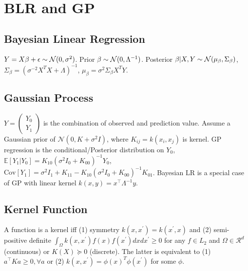 \section{BLR and GP}

\subsection*{Bayesian Linear Regression}
    $
    Y=X\beta+\epsilon \sim \mathcal{N}(0, \sigma^2)$. Prior $\beta \sim \mathcal{N}(0, \Lambda^{-1})$. Posterior $\beta | X, Y \sim\mathcal{N}(\mu_\beta, \Sigma_\beta)$, $\Sigma_\beta =  (\sigma^{-2}X^T X+\Lambda)^{-1}$, $\mu_\beta = \sigma^2\Sigma_{\beta}X^T Y$. 



\subsection*{Gaussian Process}
$Y = \left(\begin{matrix} Y_0 \\ Y_1 \end{matrix}\right)$ is the combination of observed and prediction value. Assume a Gaussian prior of $\mathcal{N}(0, K + \sigma^2 I)$, where $K_{ij}=k(x_i,x_j)$ is kernel. GP regression is the conditional/Posterior distribution on $Y_0$, $\mathbb{E} [Y_1|Y_0] = K_{1 0}(\sigma^{2} I_{0}+K_{00})^{-1}Y_0$, $\mathrm{Cov}[Y_1] = \sigma^{2}I_{1} + K_{11} - K_{10} (\sigma^2  I_{0} + K_{00})^{-1} K_{01}$. Bayesian LR is a special case of GP with linear kernel $k(x,y) = x^{\top}\Lambda^{-1}y$.

\subsection*{Kernel Function}
A function is a kernel iff (1) symmetry $k(x, x^\prime)=k(x^\prime, x)$ and (2) semi-positive definite $\int_\Omega k(x, x^\prime) f(x) f(x^\prime) dx dx^\prime \ge 0$ for any $f \in L_2$ and $\Omega \in \mathcal{R}^d$ (continuous) or $K(X)\succeq 0$ (discrete). The latter is equivalent to (1) $a^{\top} K a \geq 0, \forall a$ or (2) $k(x, x^\prime) = \phi(x)^T \phi(x^\prime)$ for some $\phi$.


